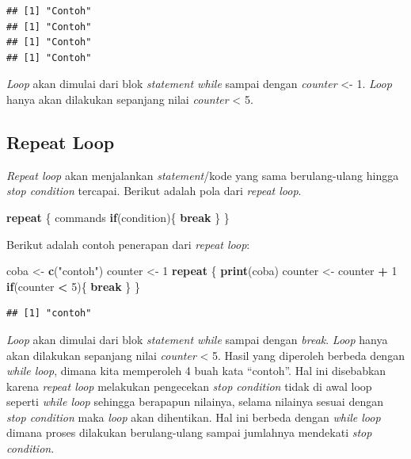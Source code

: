 \documentclass[]{book}
\newenvironment{Shaded}{\begin{snugshade}}{\end{snugshade}}
\newcommand{\KeywordTok}[1]{\textcolor[rgb]{0.13,0.29,0.53}{\textbf{#1}}}
\newcommand{\DecValTok}[1]{\textcolor[rgb]{0.00,0.00,0.81}{#1}}
\newcommand{\StringTok}[1]{\textcolor[rgb]{0.31,0.60,0.02}{#1}}
\newcommand{\ControlFlowTok}[1]{\textcolor[rgb]{0.13,0.29,0.53}{\textbf{#1}}}
\newcommand{\OperatorTok}[1]{\textcolor[rgb]{0.81,0.36,0.00}{\textbf{#1}}}
\newcommand{\NormalTok}[1]{#1}
\begin{document}
\begin{verbatim}
## [1] "Contoh"
## [1] "Contoh"
## [1] "Contoh"
## [1] "Contoh"
\end{verbatim}

\emph{Loop} akan dimulai dari blok \emph{statement while} sampai dengan
\emph{counter} \textless{}- 1. \emph{Loop} hanya akan dilakukan
sepanjang nilai \emph{counter} \textless{} 5.

\subsection{Repeat Loop}\label{repeat-loop}

\emph{Repeat loop} akan menjalankan \emph{statement}/kode yang sama
berulang-ulang hingga \emph{stop condition} tercapai. Berikut adalah
pola dari \emph{repeat loop}.

\begin{Shaded}
\begin{Highlighting}[]
\ControlFlowTok{repeat}\NormalTok{ \{}
\NormalTok{  commands}
  \ControlFlowTok{if}\NormalTok{(condition)\{}
    \ControlFlowTok{break}
\NormalTok{  \}}
\NormalTok{\}}
\end{Highlighting}
\end{Shaded}

Berikut adalah contoh penerapan dari \emph{repeat loop}:

\begin{Shaded}
\begin{Highlighting}[]
\NormalTok{coba <-}\StringTok{ }\KeywordTok{c}\NormalTok{(}\StringTok{"contoh"}\NormalTok{)}
\NormalTok{counter <-}\StringTok{ }\DecValTok{1}
\ControlFlowTok{repeat}\NormalTok{ \{}
  \KeywordTok{print}\NormalTok{(coba)}
\NormalTok{  counter <-}\StringTok{ }\NormalTok{counter }\OperatorTok{+}\StringTok{ }\DecValTok{1}
  \ControlFlowTok{if}\NormalTok{(counter }\OperatorTok{<}\StringTok{ }\DecValTok{5}\NormalTok{)\{}
\ControlFlowTok{break}
\NormalTok{  \}}
\NormalTok{\}}
\end{Highlighting}
\end{Shaded}

\begin{verbatim}
## [1] "contoh"
\end{verbatim}

\emph{Loop} akan dimulai dari blok \emph{statement while} sampai dengan
\emph{break}. \emph{Loop} hanya akan dilakukan sepanjang nilai
\emph{counter} \textless{} 5. Hasil yang diperoleh berbeda dengan
\emph{while loop}, dimana kita memperoleh 4 buah kata ``contoh''. Hal
ini disebabkan karena \emph{repeat loop} melakukan pengecekan \emph{stop
condition} tidak di awal loop seperti \emph{while loop} sehingga
berapapun nilainya, selama nilainya sesuai dengan \emph{stop condition}
maka \emph{loop} akan dihentikan. Hal ini berbeda dengan \emph{while
loop} dimana proses dilakukan berulang-ulang sampai jumlahnya mendekati
\emph{stop condition}.
\end{document}
